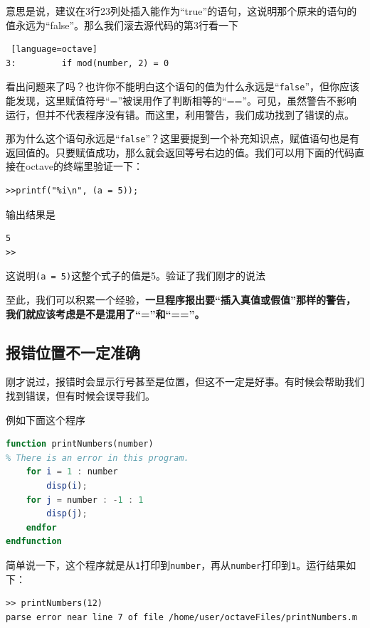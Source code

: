 \documentclass[12pt]{article}
\begin{document}
\begin{spacing}{1.4}
意思是说，建议在3行23列处插入能作为“true”的语句，这说明那个原来的语句的值永远为“false”。那么我们滚去源代码的第3行看一下

\begin{lstlisting} [language=octave]
3:         if mod(number, 2) = 0
\end{lstlisting}

看出问题来了吗？也许你不能明白这个语句的值为什么永远是“\texttt{false}”，但你应该能发现，这里赋值符号“=”被误用作了判断相等的“==”。可见，虽然警告不影响运行，但并不代表程序没有错。而这里，利用警告，我们成功找到了错误的点。

那为什么这个语句永远是“\texttt{false}”？这里要提到一个补充知识点，赋值语句也是有返回值的。只要赋值成功，那么就会返回等号右边的值。我们可以用下面的代码直接在octave的终端里验证一下：

\begin{lstlisting}
>>printf("%i\n", (a = 5));
\end{lstlisting}

输出结果是

\begin{lstlisting}
5
>>
\end{lstlisting}

这说明\texttt{(a = 5)}这整个式子的值是5。验证了我们刚才的说法

至此，我们可以积累一个经验，\textbf{一旦程序报出要“插入真值或假值”那样的警告，我们就应该考虑是不是混用了“=”和“==”。}

\subsection{报错位置不一定准确}

刚才说过，报错时会显示行号甚至是位置，但这不一定是好事。有时候会帮助我们找到错误，但有时候会误导我们。

例如下面这个程序

\begin{lstlisting}[language=octave]
function printNumbers(number)
% There is an error in this program.
    for i = 1 : number
        disp(i);
    for j = number : -1 : 1
        disp(j);
    endfor
endfunction
\end{lstlisting}

简单说一下，这个程序就是从\texttt{1}打印到\texttt{number}，再从\texttt{number}打印到\texttt{1}。运行结果如下：

\begin{lstlisting}
>> printNumbers(12)
parse error near line 7 of file /home/user/octaveFiles/printNumbers.m
    

\end{lstlisting}
\end{spacing}
\end{document}
